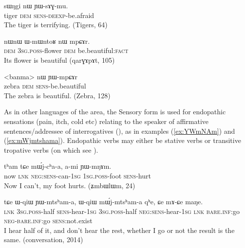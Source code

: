 \documentclass[oldfontcommands,oneside,a4paper,11pt]{article}
\newcommand{\ipa}[1]{{\phon \mbox{#1}}} %
\newcommand{\refb}[1]{(\ref{#1})}
\newcommand{\factual}[1]{\textsc{:fact}}
\begin{document}
\begin{exe}
\ex \label{ex:YWsAGmu}
\gll 
\ipa{sɯŋgi}  	\ipa{nɯ}  	\ipa{ɲɯ-sɤɣ-mu.}  \\
tiger \textsc{dem} \textsc{sens-deexp}-be.afraid \\
\glt The tiger  is terrifying. (Tigers, 64)
\end{exe}


\begin{exe}
\ex \label{ex:mpCAr}
\gll
\ipa{nɯnɯ}  	\ipa{ɯ-mɯntoʁ}  	\ipa{nɯ}  	\ipa{mpɕɤr.}  \\
\textsc{dem} \textsc{3sg.poss}-flower \textsc{dem} be.beautiful\factual{} \\
\glt Its flower is beautiful (\ipa{qarɣɤpɤt}, 105)
\end{exe}


\begin{exe}
\ex \label{ex:YWmpCAr}
\gll 
<banma> 	\ipa{nɯ}  	\ipa{ɲɯ-mpɕɤr}  \\
zebra \textsc{dem} \textsc{sens}-be.beautiful \\
\glt The zebra is beautiful. (Zebra, 128)
\end{exe}

As in other languages of the area, the Sensory form is used for endopathic sensations (pain, itch, cold etc)  relating to the speaker of affirmative sentences/addressee of interrogatives (\citealt{tournadre14evidentiality}), as in examples \refb{ex:YWmNAm} and \refb{ex:mWjmtshama}. Endopathic verbs may either be stative verbs or transitive tropative verbs (on which see \citealt{jacques13tropative}).

\begin{exe}
\ex \label{ex:YWmNAm}
\gll
\ipa{tʰam} 	\ipa{tɕe} 	\ipa{mɯ́j-cʰa-a,} 	\ipa{a-mi} 	\ipa{ɲɯ-mŋɤm.} \\
now \textsc{lnk} \textsc{neg:sens}-can-\textsc{1sg} \textsc{1sg.poss}-foot \textsc{sens}-hurt \\
\glt Now I can't, my foot hurts. (\ipa{ʑmbɯlɯm}, 24)
\end{exe}

\begin{exe}
\ex \label{ex:mWjmtshama}
\gll
\ipa{tɕe} 	\ipa{ɯ-qiɯ} 	\ipa{ɲɯ-mtsʰam-a,} 	\ipa{ɯ-qiɯ} 	\ipa{mɯ́j-mtsʰam-a} 	\ipa{qʰe,} 	\ipa{ɕe} 	\ipa{mɤ-ɕe} 	\ipa{maŋe.} \\
\textsc{lnk} \textsc{3sg.poss}-half \textsc{sens}-hear-\textsc{1sg}   \textsc{3sg.poss}-half \textsc{neg:sens}-hear-\textsc{1sg}  \textsc{lnk}  \textsc{bare.inf}:go \textsc{neg}-\textsc{bare.inf}:go \textsc{sens}:not.exist \\
\glt I hear half of it, and don't hear the rest, whether I go or not the result is the same. (conversation, 2014)
\end{exe}
\end{document}
